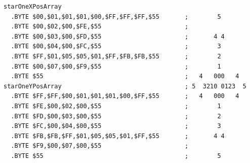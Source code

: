 \begin{lstlisting}[caption=Source code for the Star.]
starOneXPosArray  
  .BYTE $00,$01,$01,$01,$00,$FF,$FF,$FF,$55       ;        5       
  .BYTE $00,$02,$00,$FE,$55                       ;                
  .BYTE $00,$03,$00,$FD,$55                       ;       4 4      
  .BYTE $00,$04,$00,$FC,$55                       ;        3       
  .BYTE $FF,$01,$05,$05,$01,$FF,$FB,$FB,$55       ;        2       
  .BYTE $00,$07,$00,$F9,$55                       ;        1       
  .BYTE $55                                       ;   4   000   4  
starOneYPosArray                                  ; 5  3210 0123  5  
  .BYTE $FF,$FF,$00,$01,$01,$01,$00,$FF,$55       ;   4   000   4  
  .BYTE $FE,$00,$02,$00,$55                       ;        1       
  .BYTE $FD,$00,$03,$00,$55                       ;        2       
  .BYTE $FC,$00,$04,$00,$55                       ;        3       
  .BYTE $FB,$FB,$FF,$01,$05,$05,$01,$FF,$55       ;       4 4      
  .BYTE $F9,$00,$07,$00,$55                       ;                
  .BYTE $55                                       ;        5       
\end{lstlisting}



